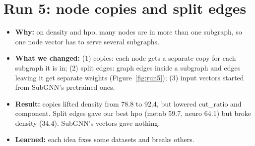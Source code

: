 \documentclass[11pt]{article}
\begin{document}
\section*{Run 5: node copies and split edges}
\begin{itemize}
  \item \textbf{Why:} on density and hpo, many nodes are in more than one subgraph, so one node vector has to serve several subgraphs.
  \item \textbf{What we changed:} (1) copies: each node gets a separate copy for each subgraph it is in; (2) split edges: graph edges inside a subgraph and edges leaving it get separate weights (Figure~\ref{fig:run5}); (3) input vectors started from SubGNN's pretrained ones.
  \item \textbf{Result:} copies lifted density from 78.8 to 92.4, but lowered cut\_ratio and component. Split edges gave our best hpo (metab 59.7, neuro 64.1) but broke density (34.4). SubGNN's vectors gave nothing.
  \item \textbf{Learned:} each idea fixes some datasets and breaks others.
\end{itemize}
\end{document}
